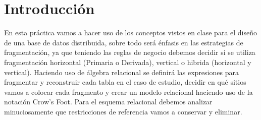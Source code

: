 \documentclass{article}
\begin{document}
    \section{Introducción}
En esta práctica vamos a hacer uso de los conceptos vistos en clase para el diseño de una base de datos distribuida, sobre todo será énfasis en las estrategias de fragmentación, ya que teniendo las reglas de negocio debemos decidir si se  utiliza fragmentación horizontal (Primaria o Derivada), vertical o hibrida (horizontal y vertical). Haciendo uso de álgebra relacional se definirá las expresiones para fragmentar y reconstruir cada tabla en el caso de estudio, decidir en qué sitios vamos a colocar cada fragmento y crear un modelo relacional haciendo uso de la notación Crow’s Foot. Para el esquema relacional debemos analizar minuciosamente que restricciones de referencia vamos a conservar y eliminar.
    
\end{document}
